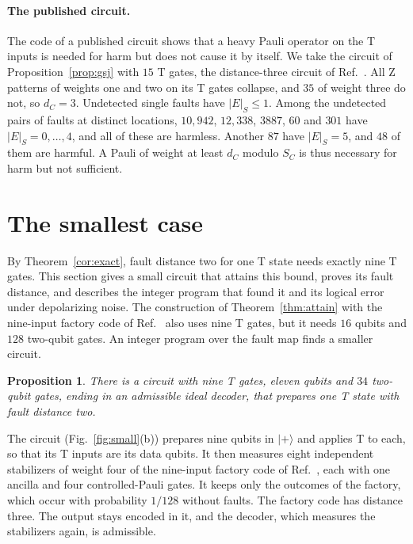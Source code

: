 \documentclass[aps,prl,reprint,twocolumn,amsmath,amssymb,floatfix,nofootinbib,superscriptaddress]{revtex4-2}
\newtheorem{proposition}[theorem]{Proposition}
\theoremstyle{definition}
\theoremstyle{remark}
\begin{document}
\paragraph*{The published circuit.}
The code of a published circuit shows that a heavy Pauli operator on the T inputs is needed for harm but does not cause it by itself. We take the circuit of Proposition~\ref{prop:gsj} with $15$ T gates, the distance-three circuit of Ref.~\cite{cultivation}. All Z patterns of weights one and two on its T gates collapse, and $35$ of weight three do not, so $d_C=3$. Undetected single faults have $|E|_S\leq1$. Among the undetected pairs of faults at distinct locations, $10{,}942$, $12{,}338$, $3887$, $60$ and $301$ have $|E|_S=0,\dots,4$, and all of these are harmless. Another $87$ have $|E|_S=5$, and $48$ of them are harmful. A Pauli of weight at least $d_C$ modulo $S_C$ is thus necessary for harm but not sufficient.

\section{The smallest case}\label{sm:t9}
By Theorem~\ref{cor:exact}, fault distance two for one T state needs exactly nine T gates. This section gives a small circuit that attains this bound, proves its fault distance, and describes the integer program that found it and its logical error under depolarizing noise. The construction of Theorem~\ref{thm:attain} with the nine-input factory code of Ref.~\cite{distillationpaper} also uses nine T gates, but it needs $16$ qubits and $128$ two-qubit gates. An integer program over the fault map finds a smaller circuit.
\begin{proposition}\label{prop:t9}
There is a circuit with nine T gates, eleven qubits and $34$ two-qubit gates, ending in an admissible ideal decoder, that prepares one T state with fault distance two.
\end{proposition}
The circuit (Fig.~\ref{fig:small}(b)) prepares nine qubits in $|{+}\rangle$ and applies T to each, so that its T inputs are its data qubits. It then measures eight independent stabilizers of weight four of the nine-input factory code of Ref.~\cite{distillationpaper}, each with one ancilla and four controlled-Pauli gates. It keeps only the outcomes of the factory, which occur with probability $1/128$ without faults. The factory code has distance three. The output stays encoded in it, and the decoder, which measures the stabilizers again, is admissible.
\end{document}
